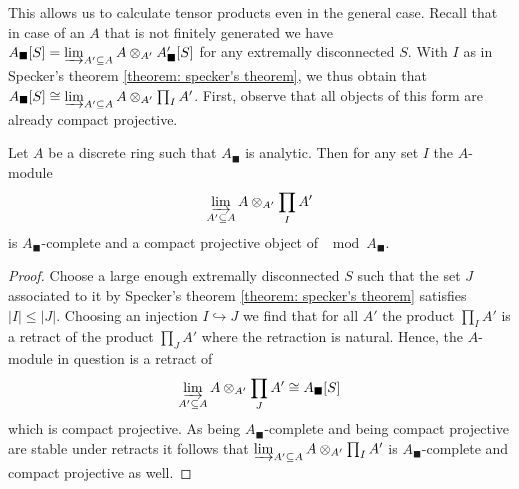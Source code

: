 This allows us to calculate tensor products even in the general case. Recall that in case of an $A$ that is not finitely generated we have ${A_\blacksquare[S]} = \varinjlim_{A'\subseteq A} A\otimes_{A'}{A'_\blacksquare[S]}$ for any extremally disconnected $S$. With $I$ as in Specker's theorem \ref{theorem: specker's theorem}, we thus obtain that ${A_\blacksquare[S]} \cong \varinjlim_{A'\subseteq A} A\otimes_{A'} \prod_I A'$. First, observe that all objects of this form are already compact projective.
\begin{lemma}
	\label{lemma: more compact projectives}
	
	Let $A$ be a discrete ring such that $A_\blacksquare$ is analytic. Then for any set $I$ the $A$-module
		$$\varinjlim_{A'\subseteq A} A\otimes_{A'} \prod_I A'$$
	is $A_\blacksquare$-complete and a compact projective object of $\mod{A_\blacksquare}$.
\end{lemma}
\begin{proof}
	Choose a large enough extremally disconnected $S$ such that the set $J$ associated to it by Specker's theorem \ref{theorem: specker's theorem} satisfies $\vert I\vert \le \vert J \vert$. Choosing an injection $I \hookrightarrow J$ we find that for all $A'$ the product $\prod_{I} A'$ is a retract of the product $\prod_J A'$ where the retraction is natural. Hence, the $A$-module in question is a retract of
		$$\varinjlim_{A'\subseteq A} A\otimes_{A'} \prod_J A'\cong {A_\blacksquare[S]}$$
	which is compact projective. As being $A_\blacksquare$-complete and being compact projective are stable under retracts it follows that $\varinjlim_{A'\subseteq A} A\otimes_{A'} \prod_I A'$ is $A_\blacksquare$-complete and compact projective as well.
\end{proof}

